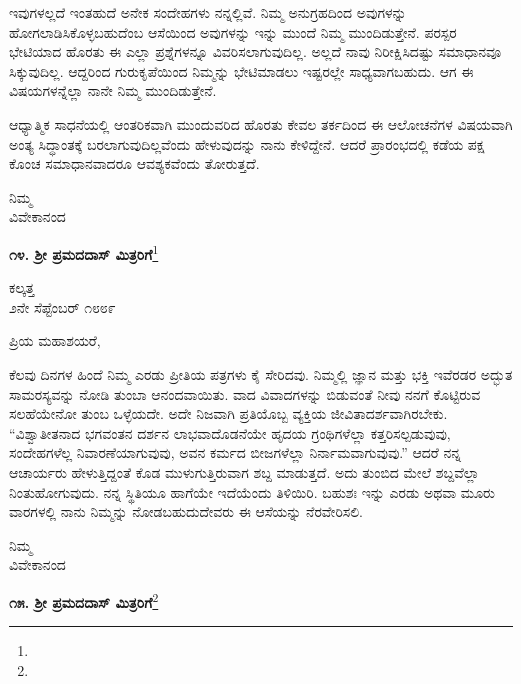 ಇವುಗಳಲ್ಲದೆ ಇಂತಹುದೆ ಅನೇಕ ಸಂದೇಹಗಳು ನನ್ನಲ್ಲಿವೆ. ನಿಮ್ಮ ಅನುಗ್ರಹದಿಂದ ಅವುಗಳನ್ನು ಹೋಗಲಾಡಿಸಿಕೊಳ್ಳಬಹುದೆಂಬ ಆಸೆಯಿಂದ ಅವುಗಳನ್ನು ಇನ್ನು ಮುಂದೆ ನಿಮ್ಮ ಮುಂದಿಡುತ್ತೇನೆ. ಪರಸ್ಪರ ಭೇಟಿಯಾದ ಹೊರತು ಈ ಎಲ್ಲಾ ಪ್ರಶ್ನೆಗಳನ್ನೂ ವಿವರಿಸಲಾಗುವುದಿಲ್ಲ. ಅಲ್ಲದೆ ನಾವು ನಿರೀಕ್ಷಿಸಿದಷ್ಟು ಸಮಾಧಾನವೂ ಸಿಕ್ಕುವುದಿಲ್ಲ. ಆದ್ದರಿಂದ ಗುರುಕೃಪೆಯಿಂದ ನಿಮ್ಮನ್ನು ಭೇಟಿಮಾಡಲು ಇಷ್ಟರಲ್ಲೇ ಸಾಧ್ಯವಾಗಬಹುದು. ಆಗ ಈ ವಿಷಯಗಳನ್ನೆಲ್ಲಾ ನಾನೇ ನಿಮ್ಮ ಮುಂದಿಡುತ್ತೇನೆ.

ಆಧ್ಯಾತ್ಮಿಕ ಸಾಧನೆಯಲ್ಲಿ ಆಂತರಿಕವಾಗಿ ಮುಂದುವರಿದ ಹೊರತು ಕೇವಲ ತರ್ಕದಿಂದ ಈ ಆಲೋಚನೆಗಳ ವಿಷಯವಾಗಿ ಅಂತ್ಯ ಸಿದ್ಧಾಂತಕ್ಕೆ ಬರಲಾಗುವುದಿಲ್ಲವೆಂದು ಹೇಳುವುದನ್ನು ನಾನು ಕೇಳಿದ್ದೇನೆ. ಆದರೆ ಪ್ರಾರಂಭದಲ್ಲಿ ಕಡೆಯ ಪಕ್ಷ ಕೊಂಚ ಸಮಾಧಾನವಾದರೂ ಆವಶ್ಯಕವೆಂದು ತೋರುತ್ತದೆ.

\vspace{-0.5cm}
{\flushright
ನಿಮ್ಮ\\ವಿವೇಕಾನಂದ\par}

\vfill\eject

\begin{center}
\textbf{೧೪. ಶ‍್ರೀ ಪ್ರಮದದಾಸ್ ಮಿತ್ರರಿಗೆ}\footnote{}
\end{center}

\vspace{-0.5cm}

\begin{flushright}
ಕಲ್ಕತ್ತ\\೨ನೇ ಸೆಪ್ಟೆಂಬರ್ ೧೮೮೯
\end{flushright}

\noindent
ಪ್ರಿಯ ಮಹಾಶಯರೆ,

ಕೆಲವು ದಿನಗಳ ಹಿಂದೆ ನಿಮ್ಮ ಎರಡು ಪ್ರೀತಿಯ ಪತ್ರಗಳು ಕೈ ಸೇರಿದವು. ನಿಮ್ಮಲ್ಲಿ ಜ್ಞಾನ ಮತ್ತು ಭಕ್ತಿ ಇವೆರಡರ ಅದ್ಭುತ ಸಾಮರಸ್ಯವನ್ನು ನೋಡಿ ತುಂಬಾ ಆನಂದವಾಯಿತು. ವಾದ ವಿವಾದಗಳನ್ನು ಬಿಡುವಂತೆ ನೀವು ನನಗೆ ಕೊಟ್ಟಿರುವ ಸಲಹೆಯೇನೋ ತುಂಬ ಒಳ್ಳೆಯದೇ. ಅದೇ ನಿಜವಾಗಿ ಪ್ರತಿಯೊಬ್ಬ ವ್ಯಕ್ತಿಯ ಜೀವಿತಾದರ್ಶವಾಗಿರಬೇಕು. ``ವಿಶ್ವಾತೀತನಾದ ಭಗವಂತನ ದರ್ಶನ ಲಾಭವಾದೊಡನೆಯೇ ಹೃದಯ ಗ್ರಂಥಿಗಳೆಲ್ಲಾ ಕತ್ತರಿಸಲ್ಪಡುವುವು, ಸಂದೇಹಗಳೆಲ್ಲ ನಿವಾರಣೆಯಾಗುವುವು, ಅವನ ಕರ್ಮದ ಬೀಜಗಳೆಲ್ಲಾ ನಿರ್ನಾಮವಾಗುವುವು.” ಆದರೆ ನನ್ನ ಆಚಾರ್ಯರು ಹೇಳುತ್ತಿದ್ದಂತೆ ಕೊಡ ಮುಳುಗುತ್ತಿರುವಾಗ ಶಬ್ದ ಮಾಡುತ್ತದೆ. ಅದು ತುಂಬಿದ ಮೇಲೆ ಶಬ್ದವೆಲ್ಲಾ ನಿಂತುಹೋಗುವುದು. ನನ್ನ ಸ್ಥಿತಿಯೂ ಹಾಗೆಯೇ ಇದೆಯೆಂದು ತಿಳಿಯಿರಿ. ಬಹುಶಃ ಇನ್ನು ಎರಡು ಅಥವಾ ಮೂರು ವಾರಗಳಲ್ಲಿ ನಾನು ನಿಮ್ಮನ್ನು ನೋಡಬಹುದು\enginline{-}ದೇವರು ಈ ಆಸೆಯನ್ನು ನೆರವೇರಿಸಲಿ.

\vspace{-0.5cm}

{\flushright
ನಿಮ್ಮ\\ವಿವೇಕಾನಂದ\par}

\begin{center}
\textbf{೧೫. ಶ‍್ರೀ ಪ್ರಮದದಾಸ್ ಮಿತ್ರರಿಗೆ}\footnote{}
\end{center}


